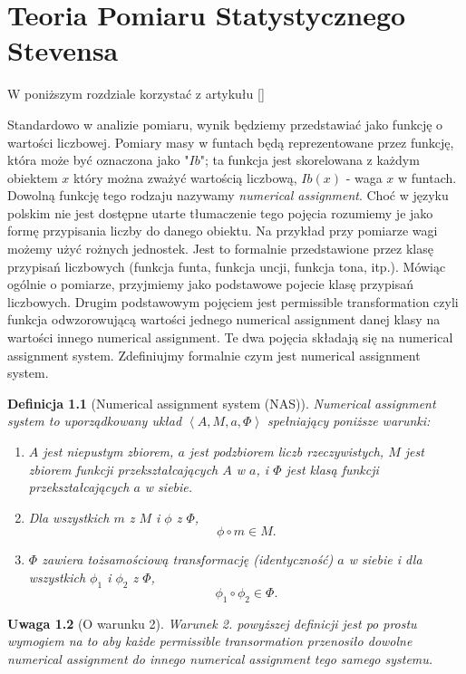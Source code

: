 \documentclass[12pt,a4paper]{report}
\newtheorem{definition}{Definicja}[chapter]
\newtheorem{remark}[definition]{Uwaga}
\newcommand{\tuple}[1]{\left\langle {#1} \right\rangle}
\begin{document}
\chapter{Teoria Pomiaru Statystycznego Stevensa}

W poniższym rozdziale korzystać z artykułu [{\citep{adams1965theory}}]

Standardowo w analizie pomiaru, wynik będziemy przedstawiać jako funkcję o wartości liczbowej. Pomiary masy w funtach będą reprezentowane przez funkcję, która może być oznaczona jako "$Ib$";  ta funkcja jest skorelowana z każdym obiektem $x$ który można zważyć wartością liczbową, $Ib(x)$ - waga $x$ w funtach. Dowolną funkcję tego rodzaju nazywamy \textit{numerical assignment}. Choć w języku polskim nie jest dostępne utarte tłumaczenie tego pojęcia rozumiemy je jako formę przypisania liczby do danego obiektu. Na przykład przy pomiarze wagi możemy użyć rożnych jednostek. Jest to formalnie przedstawione  przez klasę przypisań liczbowych (funkcja funta, funkcja uncji, funkcja tona, itp.). Mówiąc ogólnie o pomiarze, przyjmiemy jako podstawowe pojecie klasę przypisań liczbowych. Drugim podstawowym pojęciem jest permissible transformation czyli funkcja odwzorowującą wartości jednego numerical assignment danej klasy na wartości innego numerical assignment. Te dwa pojęcia składają się na numerical assignment system. Zdefiniujmy formalnie czym jest numerical assignment system.
\begin{definition}[Numerical assignment system (NAS)]
Numerical assignment system to uporządkowany układ $\tuple{A, M, a, \Phi}$ spełniający poniższe warunki:
\begin{enumerate}
\item
$A$ jest niepustym zbiorem, $a$ jest podzbiorem liczb rzeczywistych, $M$ jest zbiorem funkcji przekształcających $A$ w $a$, i $\Phi$ jest klasą funkcji przekształcających $a$ w siebie.  
\item
Dla wszystkich $m$ z $M$ i $\phi$ z $\Phi$, 
$$
\phi \circ m \in M.
$$ 
\item
$\Phi$ zawiera tożsamościową transformację (identyczność) $a$ w siebie i dla wszystkich $\phi_{1}$ i $\phi_{2}$ z $\Phi$, 
$$
\phi_{1} \circ \phi_{2} \in \Phi.
$$

\end{enumerate}

\end{definition}

\begin{remark}[O warunku 2]
Warunek 2. powyższej definicji jest po prostu wymogiem na to aby każde permissible transormation przenosiło dowolne numerical assignment do innego numerical assignment tego samego systemu.
\end{remark}
\end{document}
